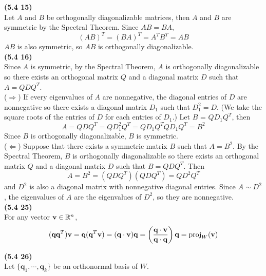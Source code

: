 \textbf{(5.4 15)} \\
Let $A$ and $B$ be orthogonally diagonalizable matrices, then $A$ and $B$ are symmetric by the Spectral Theorem. Since $AB = BA$, \begin{equation*}
	(AB)^T = (BA)^T = A^TB^T = AB
\end{equation*} $AB$ is also symmetric, so $AB$ is orthogonally diagonalizable. \\

\textbf{(5.4 16)} \\
Since $A$ is symmetric, by the Spectral Theorem, $A$ is orthogonally diagonalizable so there exists an orthogonal matrix $Q$ and a diagonal matrix $D$ such that $A = QDQ^T$. \\

($\Rightarrow$) If every eigenvalues of $A$ are nonnegative, the diagonal entries of $D$ are nonnegative so there exists a diagonal matrix $D_1$ such that $D_1^2 = D$. (We take the square roots of the entries of $D$ for each entries of $D_1$.) Let $B$ = $QD_1Q^T$, then\begin{equation*}
	A = QDQ^T = QD_1^2Q^T = QD_1Q^TQD_1Q^T = B^2
\end{equation*} Since $B$ is orthogonally diagonalizable, $B$ is symmetric. \\

($\Leftarrow$) Suppose that there exists a symmetric matrix $B$ such that $A = B^2$. By the Spectral Theorem, $B$ is orthogonally diagonalizable so there exists an orthogonal matrix $Q$ and a diagonal matrix $D$ such that $B = QDQ^T$. Then \begin{equation*}
	A = B^2 = (QDQ^T)(QDQ^T) = QD^2Q^T
\end{equation*} and $D^2$ is also a diagonal matrix with nonnegative diagonal entries. Since $A \sim D^2$, the eigenvalues of $A$ are the eigenvalues of $D^2$, so they are nonnegative. \\

\textbf{(5.4 25)} \\
For any vector $\textbf{v} \in \mathbb{R}^{n}$, \begin{equation*}
	(\textbf{q}\textbf{q}^T)\textbf{v} = \textbf{q}(\textbf{q}^T\textbf{v}) = (\textbf{q} \cdot \textbf{v})\textbf{q} = \left (\frac{\textbf{q} \cdot \textbf{v}}{\textbf{q} \cdot \textbf{q}} \right )\textbf{q} = \textnormal{proj}_W(\textbf{v})
\end{equation*}

\textbf{(5.4 26)} \\
Let $\{ \textbf{q}_1, \cdots, \textbf{q}_k \}$ be an orthonormal basis of $W$. \\

